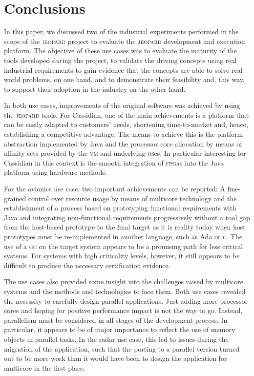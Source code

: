 \documentclass{sig-alternate}
\newcommand{\acronym}[1]{\textsc{#1}}
\begin{document}
\section{Conclusions}\label{sec:conc}
In this paper, we discussed two of the industrial experiments
performed in the scope of the \acronym{jeopard} project
to evaluate the \acronym{jeopard} development and execution
platform. The objective of these use cases was
to evaluate the maturity of the tools developed during the project,
to validate the driving concepts using real industrial requirements
to gain evidence that the concepts are able to
solve real world problems, on one hand, and 
to demonstrate their feasibility and, this way,
to support their adoption in the industry on the other hand.

In both use cases, improvements of the original software 
was achieved by using the \acronym{jeopard} tools. 
For Cassidian, one of the main achievements
is a platform that can be easily 
adapted to customers' needs,
shortening time-to-market and, hence,
establishing a competitive advantage.
The means to achieve this is the platform abstraction
implemented by Java and the processor core allocation
by means of affinity sets provided by the \acronym{vm} 
and underlying \acronym{os}es.
In particular interesting for Cassidian
in this context is the smooth integration 
of \acronym{fpga}s into the Java platform
using hardware methods. 

For the avionics use case, two important achievements
can be reported: 
A fine-grained control over resource usage
by means of multicore technology and
the establishment of a process based on prototyping
functional requirements with Java and
integrating non-functional requirements
progressively without a tool gap from the host-based prototype
to the final target as it is reality today
when host prototypes must be re-implemented 
in another language, such as Ada or \acronym{c}.
The use of a \acronym{gc} on the target system
appears to be a promising path for less critical systems.
For systems with high criticality levels, however,
it still appears to be difficult to produce the 
necessary certification evidence. 

The use cases also provided some insight into the challenges
raised by multicore systems and the methods and technologies
to face them. Both use cases revealed the necessity
to carefully design parallel applications.
Just adding more processor cores and hoping for
positive performance impact is not the way to go.
Instead, parallelism must be considered in all stages
of the development process.
In particular, it appears to be of major importance
to reflect the use of memory objects in parallel tasks.
In the radar use case, this led to issues during
the migration of the application, such that the porting
to a parallel version turned out to be more work
than it would have been to design the application
for multicore in the first place.
\end{document}
